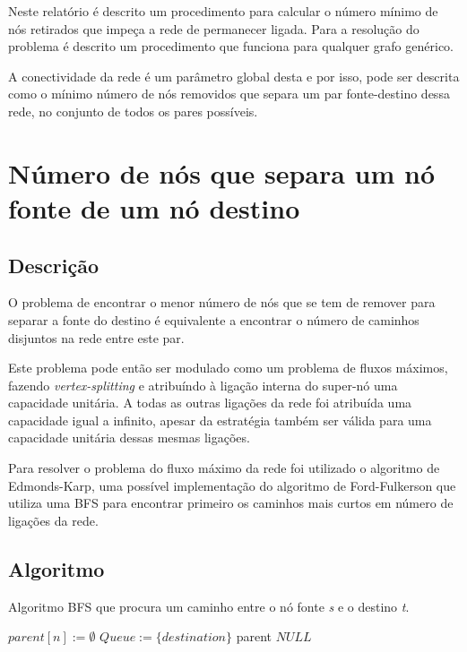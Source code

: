 \documentclass[12pt,a4paper]{scrartcl}
\begin{document}
Neste relatório é descrito um procedimento para calcular o número mínimo de nós retirados que impeça a rede de permanecer ligada. Para a resolução do problema é descrito um procedimento que funciona para qualquer grafo genérico.

A conectividade da rede é um parâmetro global desta e por isso, pode ser descrita como o mínimo número de nós removidos que separa um par fonte-destino dessa rede, no conjunto de todos os pares possíveis.

\section{Número de nós que separa um nó fonte de um nó destino}

\subsection{Descrição}
O problema de encontrar o menor número de nós que se tem de remover para separar a fonte do destino é equivalente a encontrar o número de caminhos disjuntos na rede entre este par.

Este problema pode então ser modulado como um problema de fluxos máximos, fazendo \textit{vertex-splitting} e atribuíndo à ligação interna do super-nó uma capacidade unitária. A todas as outras ligações da rede foi atribuída uma capacidade igual a infinito, apesar da estratégia também ser válida para uma capacidade unitária dessas mesmas ligações.

Para resolver o problema do fluxo máximo da rede foi utilizado o algoritmo de Edmonds-Karp, uma possível implementação do algoritmo de Ford-Fulkerson que utiliza uma BFS para encontrar primeiro os caminhos mais curtos em número de ligações da rede.


\subsection{Algoritmo}

\begin{algorithm}
\caption{Algoritmo BFS que procura um caminho entre o nó fonte \textit{s} e o destino \textit{t}.}\label{alg:bfs_goal}
\begin{algorithmic}[1]
    	\State $parent[n] := \emptyset $
    \EndFor
    \State $Queue :=  \{destination\}$
      		\Return parent 
      \EndIf
            \EndIf
      \EndFor
  	\EndWhile
  	\Return $NULL$
\EndProcedure
\end{algorithmic}
\end{algorithm}
\end{document}
